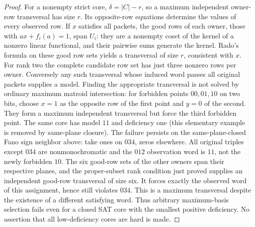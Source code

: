 \documentclass[11pt]{article}
\begin{document}
\begin{proof}
For a nonempty strict core, $\delta=|C|-r$, so a maximum independent owner-row transversal has size $r$. Its opposite-row equations determine the values of every observed row. If $x$ satisfies all packets, the good rows of each owner, those with $a x+f_i(a)=1$, span $U_i$: they are a nonempty coset of the kernel of a nonzero linear functional, and their pairwise sums generate the kernel. Rado's formula on these good row sets yields a transversal of size $r$, consistent with $x$. For rank two the complete candidate row set has just three nonzero rows per owner. Conversely any such transversal whose induced word passes all original packets supplies a model. Finding the appropriate transversal is not solved by ordinary maximum matroid intersection: for forbidden points $00,01,10$ on two bits, choose $x=1$ as the opposite row of the first point and $y=0$ of the second. They form a maximum independent transversal but force the third forbidden point. The same core has model $11$ and deficiency one (this elementary example is removed by same-plane closure). The failure persists on the same-plane-closed Fano sign neighbor above: take ones on $034$, zeros elsewhere. All original triples except $034$ are nonmonochromatic and the $012$ observation word is $11$, not the newly forbidden $10$. The six good-row sets of the other owners span their respective planes, and the proper-subset rank condition just proved supplies an independent good-row transversal of size six. It forces exactly the observed word of this assignment, hence still violates $034$. This is a maximum transversal despite the existence of a different satisfying word. Thus arbitrary maximum-basis selection fails even for a closed SAT core with the smallest positive deficiency. No assertion that all low-deficiency cores are hard is made.
\end{proof}
\end{document}
